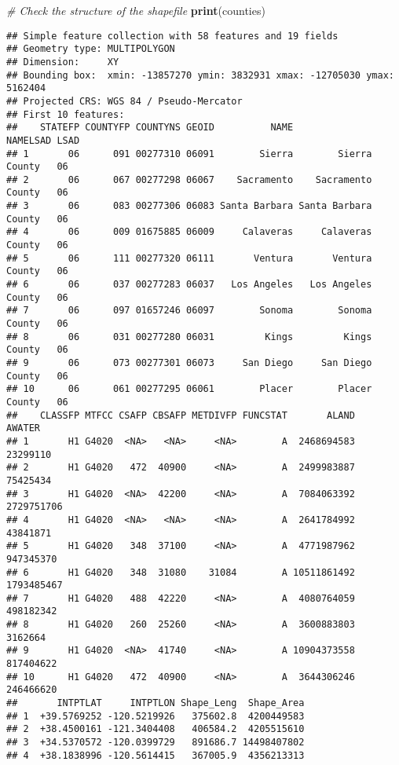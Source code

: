 \documentclass[
]{article}
\newenvironment{Shaded}{\begin{snugshade}}{\end{snugshade}}
\newcommand{\CommentTok}[1]{\textcolor[rgb]{0.56,0.35,0.01}{\textit{#1}}}
\newcommand{\FunctionTok}[1]{\textcolor[rgb]{0.13,0.29,0.53}{\textbf{#1}}}
\newcommand{\NormalTok}[1]{#1}
\begin{document}
\begin{Shaded}
\begin{Highlighting}[]
\CommentTok{\# Check the structure of the shapefile}
\FunctionTok{print}\NormalTok{(counties)}
\end{Highlighting}
\end{Shaded}

\begin{verbatim}
## Simple feature collection with 58 features and 19 fields
## Geometry type: MULTIPOLYGON
## Dimension:     XY
## Bounding box:  xmin: -13857270 ymin: 3832931 xmax: -12705030 ymax: 5162404
## Projected CRS: WGS 84 / Pseudo-Mercator
## First 10 features:
##    STATEFP COUNTYFP COUNTYNS GEOID          NAME             NAMELSAD LSAD
## 1       06      091 00277310 06091        Sierra        Sierra County   06
## 2       06      067 00277298 06067    Sacramento    Sacramento County   06
## 3       06      083 00277306 06083 Santa Barbara Santa Barbara County   06
## 4       06      009 01675885 06009     Calaveras     Calaveras County   06
## 5       06      111 00277320 06111       Ventura       Ventura County   06
## 6       06      037 00277283 06037   Los Angeles   Los Angeles County   06
## 7       06      097 01657246 06097        Sonoma        Sonoma County   06
## 8       06      031 00277280 06031         Kings         Kings County   06
## 9       06      073 00277301 06073     San Diego     San Diego County   06
## 10      06      061 00277295 06061        Placer        Placer County   06
##    CLASSFP MTFCC CSAFP CBSAFP METDIVFP FUNCSTAT       ALAND     AWATER
## 1       H1 G4020  <NA>   <NA>     <NA>        A  2468694583   23299110
## 2       H1 G4020   472  40900     <NA>        A  2499983887   75425434
## 3       H1 G4020  <NA>  42200     <NA>        A  7084063392 2729751706
## 4       H1 G4020  <NA>   <NA>     <NA>        A  2641784992   43841871
## 5       H1 G4020   348  37100     <NA>        A  4771987962  947345370
## 6       H1 G4020   348  31080    31084        A 10511861492 1793485467
## 7       H1 G4020   488  42220     <NA>        A  4080764059  498182342
## 8       H1 G4020   260  25260     <NA>        A  3600883803    3162664
## 9       H1 G4020  <NA>  41740     <NA>        A 10904373558  817404622
## 10      H1 G4020   472  40900     <NA>        A  3644306246  246466620
##       INTPTLAT     INTPTLON Shape_Leng  Shape_Area
## 1  +39.5769252 -120.5219926   375602.8  4200449583
## 2  +38.4500161 -121.3404408   406584.2  4205515610
## 3  +34.5370572 -120.0399729   891686.7 14498407802
## 4  +38.1838996 -120.5614415   367005.9  4356213313

\end{verbatim}
\end{document}
